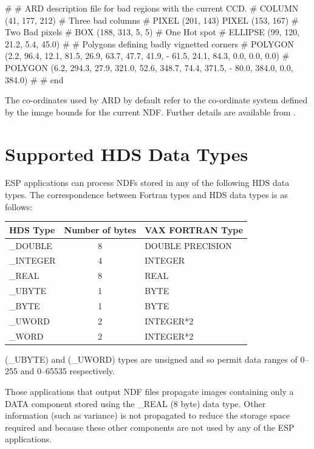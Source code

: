 \documentclass[twoside,11pt]{starlink}
\begin{document}
\begin{terminalv}
#
# ARD description file for bad regions with the current CCD.
#
COLUMN (41, 177, 212)   # Three bad columns
#
PIXEL (201, 143)
PIXEL (153, 167)   # Two Bad pixels
#
BOX (188, 313, 5, 5)   # One Hot spot
#
ELLIPSE (99, 120, 21.2, 5.4, 45.0)
#
# Polygons defining badly vignetted corners
#
POLYGON (2.2, 96.4, 12.1, 81.5, 26.9, 63.7, 47.7, 41.9, -
        61.5, 24.1, 84.3, 0.0, 0.0, 0.0)
#
POLYGON (6.2, 294.3, 27.9, 321.0, 52.6, 348.7, 74.4, 371.5, -
        80.0, 384.0, 0.0, 384.0)
#
# end
\end{terminalv}

The co-ordinates used by ARD by default refer to the co-ordinate system
defined by the image bounds for the current NDF. Further details are available from
.

\newpage
\section{Supported HDS Data Types}
ESP applications can process NDFs stored in any of the
following HDS data types.
The correspondence between Fortran types and HDS data types is as follows:

\begin{center}
\begin{tabular}{|l|c|l|} \hline
\textbf{HDS Type} & \textbf{Number of bytes} & \textbf{VAX FORTRAN Type}\\ \hline
\_DOUBLE & 8 & DOUBLE PRECISION \\
\_INTEGER & 4 & INTEGER \\
\_REAL & 8 & REAL \\
\_UBYTE & 1 & BYTE \\
\_BYTE & 1 & BYTE \\
\_UWORD & 2 & INTEGER*2 \\
\_WORD & 2 & INTEGER*2\\
\hline
\end{tabular}
\end{center}

(\_UBYTE) and (\_UWORD) types are unsigned and so permit data ranges of
0--255 and 0--65535 respectively.

Those applications that output NDF files propagate images containing only
a DATA component stored using the \_REAL (8 byte) data type. Other information
(such as variance) is not propagated to reduce the storage space required and
because these other components are not used by any of the ESP applications.
\end{document}
